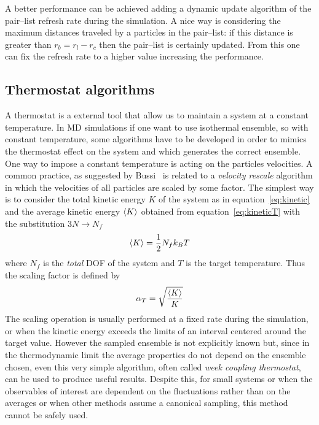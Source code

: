 A better performance can be achieved adding a dynamic update algorithm of the pair--list refresh rate during the simulation. A nice way is considering the maximum distances traveled by a particles in the pair--list: if this distance is greater than $r_b = r_l - r_c$ then the pair--list is certainly updated. From this one can fix the refresh rate to a higher value increasing the performance.

\subsection{Thermostat algorithms} %
A thermostat is a external tool that allow us to maintain a system at a constant temperature. In \ac{MD} simulations if one want to use isothermal ensemble, so with constant temperature, some algorithms have to be developed in order to mimics the thermostat effect on the system and which generates the correct ensemble. One way to impose a constant temperature is acting on the particles velocities. A common practice, as suggested by Bussi \etal\, \cite{Bussi} is related to a \textit{velocity rescale} algorithm in which the velocities of all particles are scaled by some factor. The simplest way is to consider the total kinetic energy $K$ of the system as in equation~\eqref{eq:kinetic} and the average kinetic energy $\left \langle K \right \rangle$ obtained from equation~\eqref{eq:kineticT} with the substitution $3N\rightarrow N_f$
\begin{equation*}
	\left \langle K \right \rangle = \frac{1}{2}N_f k_B T
\end{equation*}
where $N_f$ is the \textit{total} \ac{DOF} of the system and $T$ is the target temperature. Thus the scaling factor is defined by
\begin{equation*}
	\alpha_{T} = \sqrt{\frac{\left \langle K \right \rangle}{K}}
\end{equation*}
The scaling operation is usually performed at a fixed rate during the simulation, or when the kinetic energy exceeds the limits of an interval centered around the target value. However the sampled ensemble is not explicitly known but, since in the thermodynamic limit the average properties do not depend on the ensemble chosen, even this very simple algorithm, often called \textit{week coupling thermostat}, can be used to produce useful results. Despite this, for small systems or when the observables of interest are dependent on the fluctuations rather than on the averages or when other methods assume a canonical sampling, this method cannot be safely used.

